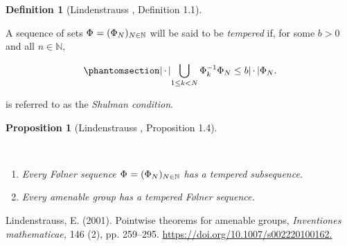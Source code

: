 \documentclass[
  british,
]{article}
\newlength{\cslhangindent}
\newenvironment{CSLReferences}[2] %
 {\begin{list}{}{%
  \setlength{\itemindent}{0pt}
  \setlength{\leftmargin}{0pt}
  \setlength{\parsep}{0pt}
  \ifodd #1
   \setlength{\leftmargin}{\cslhangindent}
   \setlength{\itemindent}{-1\cslhangindent}
  \fi
  \setlength{\itemsep}{#2\baselineskip}}}
 {\end{list}}
\providecommand{\tightlist}{%
  \setlength{\itemsep}{0pt}\setlength{\parskip}{0pt}}
\theoremstyle{plain}
\newtheorem{proposition}{Proposition}[section]
\theoremstyle{definition}
\newtheorem{definition}{Definition}[section]
\theoremstyle{remark}
\newcommand{\Folner}[1][\vphantom{}]{{\Phi}_{#1}}
\newcommand{\CountingMeasure}[1][\,\cdot\,]{{\left|#1\right|}}
\begin{document}
\begin{definition}[Lindenstrauss
, Definition
1.1]\protect\hypertarget{def-tempered}{}\label{def-tempered}

A sequence of sets \(\Folner=(\Folner[N])_{N\in\mathbb{N}}\) will be
said to be \emph{tempered} if, for some \(b>0\) and all
\(n\in\mathbb{N}\),

\begin{equation}\phantomsection\label{eq-Shulman}{
\CountingMeasure{\bigcup_{1\leq k<N}\Folner[k]^{-1}\Folner[N]}\leq b\CountingMeasure{\Folner[N]}.
}\end{equation}

is referred to as the \emph{Shulman condition}.

\end{definition}

\begin{proposition}[Lindenstrauss
, Proposition
1.4]\protect\hypertarget{prp-temperedFolner}{}\label{prp-temperedFolner}

~

\begin{enumerate}
\def\labelenumi{\arabic{enumi}.}
\tightlist
\item
  Every Følner sequence \(\Folner=(\Folner[N])_{N\in\mathbb{N}}\) has a
  tempered subsequence.
\item
  Every amenable group has a tempered Følner sequence.
\end{enumerate}

\end{proposition}

\label{refs}
\begin{CSLReferences}{1}{0}
Lindenstrauss, E. (2001). \textquotesingle Pointwise theorems for
amenable groups\textquotesingle, \emph{\emph{Inventiones mathematicae},}
146 (2), pp. 259--295.
\href{https://doi.org/10.1007/s002220100162}{https://doi.org/10.1007/s002220100162.}

\end{CSLReferences}
\end{document}
